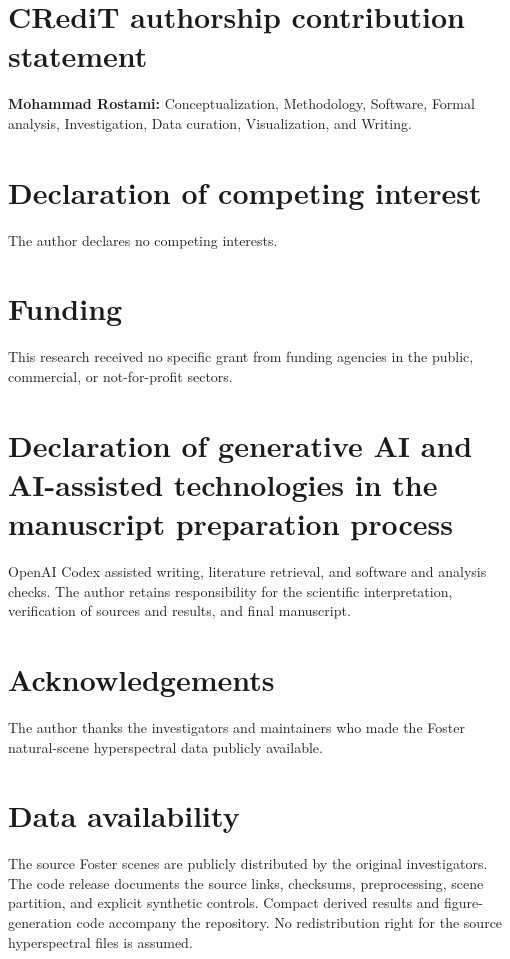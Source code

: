 \documentclass[authoryear,preprint,review,12pt]{elsarticle}
\begin{document}
\section*{CRediT authorship contribution statement}
\textbf{Mohammad Rostami:} Conceptualization, Methodology, Software, Formal analysis, Investigation, Data curation, Visualization, and Writing.
\section*{Declaration of competing interest}
The author declares no competing interests.
\section*{Funding}
This research received no specific grant from funding agencies in the public, commercial, or not-for-profit sectors.
\section*{Declaration of generative AI and AI-assisted technologies in the manuscript preparation process}
OpenAI Codex assisted writing, literature retrieval, and software and analysis checks. The author retains responsibility for the scientific interpretation, verification of sources and results, and final manuscript.
\section*{Acknowledgements}
The author thanks the investigators and maintainers who made the Foster natural-scene hyperspectral data publicly available.
\section*{Data availability}
The source Foster scenes are publicly distributed by the original investigators. The code release documents the source links, checksums, preprocessing, scene partition, and explicit synthetic controls. Compact derived results and figure-generation code accompany the repository. No redistribution right for the source hyperspectral files is assumed.


\end{document}
